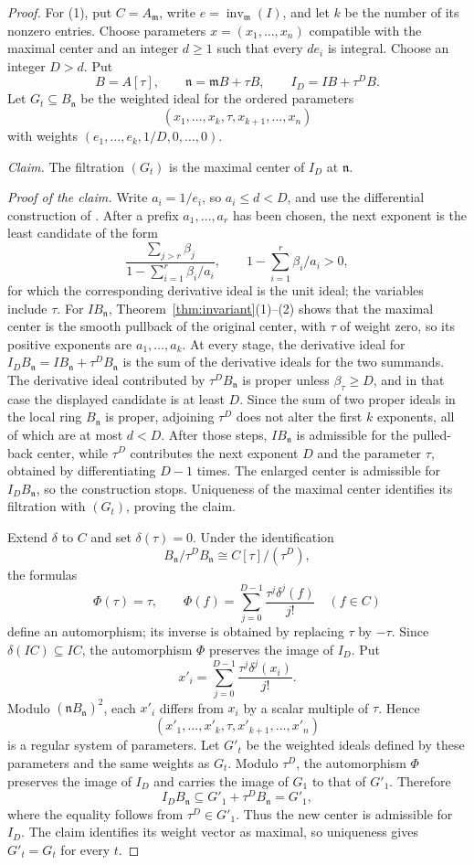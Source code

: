 \documentclass[11pt]{amsart}
\numberwithin{equation}{section}
\theoremstyle{definition}
\newcommand{\fm}{\mathfrak{m}}
\newcommand{\fn}{\mathfrak{n}}
\DeclareMathOperator{\inv}{inv}
\begin{document}
\begin{proof}
For (1), put $C=A_\fm$, write $e=\inv_\fm(I)$, and let $k$ be the number of its nonzero entries. Choose parameters $x=(x_1,\ldots,x_n)$ compatible with the maximal center and an integer $d\ge1$ such that every $de_i$ is integral. Choose an integer $D>d$. Put
\[
  B=A[\tau],\qquad \fn=\fm B+\tau B,\qquad
  I_D=IB+\tau^DB.
\]
Let $G_t\subseteq B_\fn$ be the weighted ideal for the ordered parameters
\[
  (x_1,\ldots,x_k,\tau,x_{k+1},\ldots,x_n)
\]
with weights $(e_1,\ldots,e_k,1/D,0,\ldots,0)$.

\medskip
\noindent\emph{Claim.} The filtration $(G_t)$ is the maximal center of $I_D$ at $\fn$.

\smallskip
\noindent\emph{Proof of the claim.}
Write $a_i=1/e_i$, so $a_i\le d<D$, and use the differential construction of \cite[Sections~3.2--3.3]{Brais}. After a prefix $a_1,\ldots,a_r$ has been chosen, the next exponent is the least candidate of the form
\[
  \frac{\sum_{j>r}\beta_j}
       {1-\sum_{i=1}^r\beta_i/a_i},
  \qquad 1-\sum_{i=1}^r\beta_i/a_i>0,
\]
for which the corresponding derivative ideal is the unit ideal; the variables include $\tau$. For $IB_\fn$, Theorem~\ref{thm:invariant}(1)--(2) shows that the maximal center is the smooth pullback of the original center, with $\tau$ of weight zero, so its positive exponents are $a_1,\ldots,a_k$. At every stage, the derivative ideal for $I_DB_\fn=IB_\fn+\tau^DB_\fn$ is the sum of the derivative ideals for the two summands. The derivative ideal contributed by $\tau^DB_\fn$ is proper unless $\beta_\tau\ge D$, and in that case the displayed candidate is at least $D$. Since the sum of two proper ideals in the local ring $B_\fn$ is proper, adjoining $\tau^D$ does not alter the first $k$ exponents, all of which are at most $d<D$. After those steps, $IB_\fn$ is admissible for the pulled-back center, while $\tau^D$ contributes the next exponent $D$ and the parameter $\tau$, obtained by differentiating $D-1$ times. The enlarged center is admissible for $I_DB_\fn$, so the construction stops. Uniqueness of the maximal center identifies its filtration with $(G_t)$, proving the claim.
\medskip

Extend $\delta$ to $C$ and set $\delta(\tau)=0$. Under the identification
\[
  B_\fn/\tau^DB_\fn\cong C[\tau]/(\tau^D),
\]
the formulas
\[
  \Phi(\tau)=\tau,\qquad
  \Phi(f)=\sum_{j=0}^{D-1}\frac{\tau^j\delta^j(f)}{j!}\quad(f\in C)
\]
define an automorphism; its inverse is obtained by replacing $\tau$ by $-\tau$. Since $\delta(IC)\subseteq IC$, the automorphism $\Phi$ preserves the image of $I_D$. Put
\[
  x'_i=\sum_{j=0}^{D-1}\frac{\tau^j\delta^j(x_i)}{j!}.
\]
Modulo $(\fn B_\fn)^2$, each $x'_i$ differs from $x_i$ by a scalar multiple of $\tau$. Hence
\[
  (x'_1,\ldots,x'_k,\tau,x'_{k+1},\ldots,x'_n)
\]
is a regular system of parameters. Let $G'_t$ be the weighted ideals defined by these parameters and the same weights as $G_t$. Modulo $\tau^D$, the automorphism $\Phi$ preserves the image of $I_D$ and carries the image of $G_1$ to that of $G'_1$. Therefore
\[
  I_DB_\fn\subseteq G'_1+\tau^DB_\fn=G'_1,
\]
where the equality follows from $\tau^D\in G'_1$. Thus the new center is admissible for $I_D$. The claim identifies its weight vector as maximal, so uniqueness gives $G'_t=G_t$ for every $t$.


\end{proof}
\end{document}
